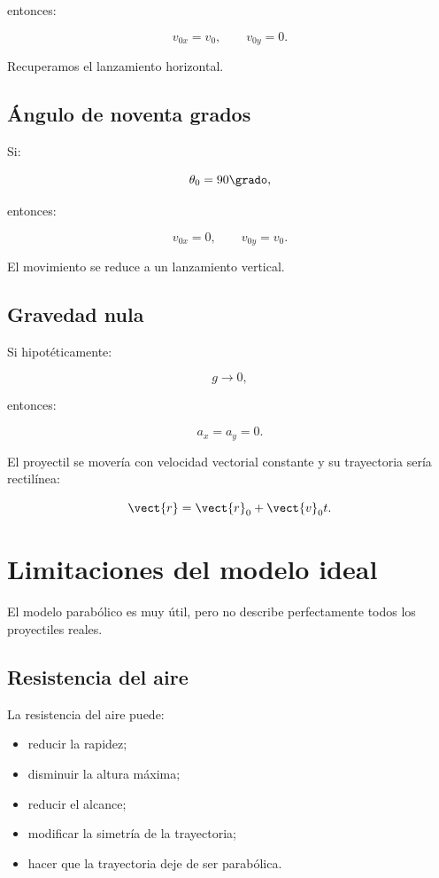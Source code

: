 entonces:

\[
v_{0x}=v_0,
\qquad
v_{0y}=0.
\]

Recuperamos el lanzamiento horizontal.


\subsection{Ángulo de noventa grados}

Si:

\[
\theta_0=90\grado,
\]

entonces:

\[
v_{0x}=0,
\qquad
v_{0y}=v_0.
\]

El movimiento se reduce a un lanzamiento vertical.


\subsection{Gravedad nula}

Si hipotéticamente:

\[
g\to0,
\]

entonces:

\[
a_x=a_y=0.
\]

El proyectil se movería con velocidad vectorial constante y su trayectoria sería
rectilínea:

\[
\vect{r}
=
\vect{r}_0+\vect{v}_0t.
\]


\section{Limitaciones del modelo ideal}

El modelo parabólico es muy útil, pero no describe perfectamente todos los
proyectiles reales.

\subsection{Resistencia del aire}

La resistencia del aire puede:

\begin{itemize}
    \item reducir la rapidez;
    \item disminuir la altura máxima;
    \item reducir el alcance;
    \item modificar la simetría de la trayectoria;
    \item hacer que la trayectoria deje de ser parabólica.
\end{itemize}


